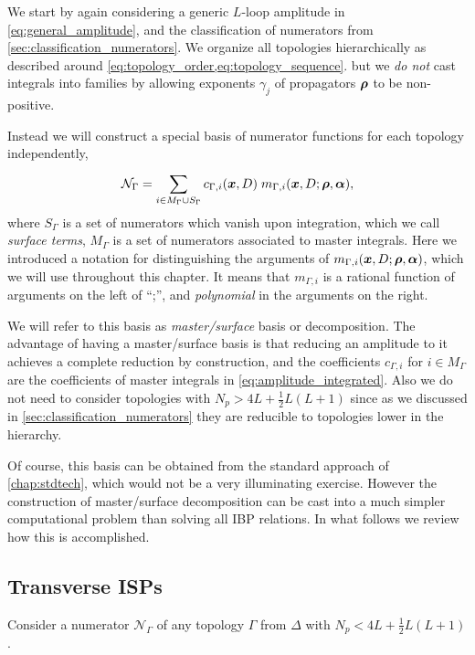 We start by again considering a generic $L$-loop amplitude in \cref{eq:general_amplitude},
and  the classification of numerators from \cref{sec:classification_numerators}.
We organize all topologies hierarchically as described around \cref{eq:topology_order,eq:topology_sequence}.
but we \emph{do not} cast integrals into families by allowing exponents $\gamma_j$ of propagators $\vb*{\rho}$ to be non-positive.

Instead we will construct a special basis of numerator functions for each topology independently,
\begin{equation} \label{eq:master_surface_basis}
  \mathcal{N}_\Gamma = \sum_{i \in M_\Gamma \cup S_\Gamma}^{} c_{\Gamma, i}(\vb*{x},D) \; m_{\Gamma, i} (\vb*{x},D;\vb*{\rho},\vb*{\alpha}),
\end{equation}
where $S_\Gamma$ is a set of numerators which vanish upon integration, which we call \emph{surface terms}, $M_\Gamma$ is a set of numerators associated to master integrals.
Here we introduced a notation for distinguishing the arguments of $m_{\Gamma, i} (\vb*{x},D;\vb*{\rho},\vb*{\alpha})$,
which we will use throughout this chapter. 
It means that $m_{\Gamma, i}$ is a rational function of arguments on the left of ``;'', and \emph{polynomial} in the arguments on the right. 

We will refer to this basis as \emph{master/surface} basis or decomposition.
The advantage of having a master/surface basis is that
reducing an amplitude to it achieves
a complete reduction by construction,
and the coefficients $c_{\Gamma,i}$ for $i\in M_\Gamma$ are the coefficients
of master integrals in \cref{eq:amplitude_integrated}.
Also we do not need to consider topologies with $N_p > 4L + \frac{1}{2}L(L+1)$ since as we discussed in \cref{sec:classification_numerators}
they are reducible to topologies lower in the hierarchy.

Of course, this basis can be obtained from the standard approach of \cref{chap:stdtech}, which would not be a very illuminating exercise.
However the construction of master/surface decomposition can be cast into a much simpler computational problem than solving all IBP relations.
In what follows we review how this is accomplished.


\subsection{Transverse ISPs}
\label{sec:traceless_completion}

Consider a numerator $\mathcal{N}_\Gamma$ of any topology $\Gamma$ from $\Delta$ with $N_p <  4L + \frac{1}{2}L(L+1)$.

